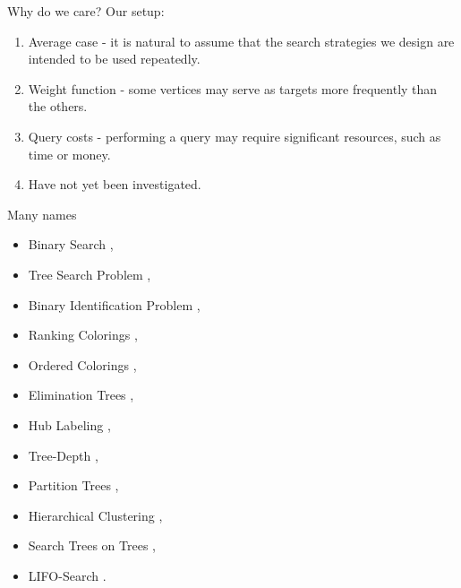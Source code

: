 \documentclass{beamer}
\begin{document}
\begin{frame}{Why do we care?}
Our setup:
\begin{enumerate}
    \item Average case - it is natural to assume that the search strategies we design are intended to be used repeatedly. 
    \item Weight function - some vertices may serve 
as targets more frequently than the others. 
    \item Query costs - performing a query may require 
significant resources, such as time or money. 
\item Have not yet been investigated.
\end{enumerate} 
\end{frame}

\begin{frame}{Many names}
\begin{itemize}
    \item Binary Search \cite{OnakParys2006GenOfBSSInTsAndFLikePosets,dereniowski2017ApproxSsForGeneralBSinWTs,Deligkas2019BsInGsRev,Emamjomeh2016DetAndProbBSinGs,dereniowski2022CFApproxAlgForBSInTsWithMonoQTimes,dereniowski2024SInTsMonoQTs,noisyBSSFC,Dereniowski2024OnMG,EfficientNoisyBinarySearch,Dereniowski2023Edge},
    \item Tree Search Problem \cite{Jacobs2010OnTheComplexSearchInTsAvg,Cicalese2014ImprovedApproxAvgTs,Cicalese2016OnTSPwNonUniCost}, 
    \item Binary Identification Problem \cite{Cicalese2012BinIdentPForWTs}, 
    \item Ranking Colorings \cite{Knuth1973,Dereniowski2009ERankOfWTs,DereniowskiERAndSInPOSets,DereniowskiEfPQProcByGRank,DereniowskiVxRankOfChGsAndWTs,Lam1998ERankOfGsIsH}, 
    \item Ordered Colorings \cite{KATCHALSKI1995141}, 
    \item Elimination Trees \cite{Pothen1988OptimalEliminationTrees}, 
    \item Hub Labeling \cite{Angelidakis2018ShortestPQ},
    \item Tree-Depth \cite{NESETRIL20061022,BOROWIECKI2023113682},
    \item Partition Trees \cite{Hgemo2024TightAB},
    \item Hierarchical Clustering \cite{Acostfunctionforsimilaritybasedhierarchicalclustering,HCObjFsandAlgs,Approximatehierarchicalclusteringviasparsestcutandspreadingmetrics}, 
    \item Search Trees on Trees \cite{SplayTonT,Fast_app_centroid_trees}, 
    \item LIFO-Search \cite{GIANNOPOULOU20122089}. 
\end{itemize}
\end{frame}
\end{document}
